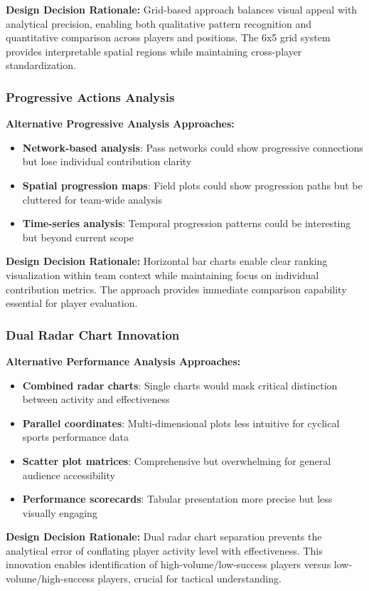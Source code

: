 \documentclass[12pt,a4paper]{article}
\begin{document}
\textbf{Design Decision Rationale:}
Grid-based approach balances visual appeal with analytical precision, enabling both qualitative pattern recognition and quantitative comparison across players and positions. The 6x5 grid system provides interpretable spatial regions while maintaining cross-player standardization.

\subsubsection{Progressive Actions Analysis}
\textbf{Alternative Progressive Analysis Approaches:}
\begin{itemize}
    \item \textbf{Network-based analysis}: Pass networks could show progressive connections but lose individual contribution clarity
    \item \textbf{Spatial progression maps}: Field plots could show progression paths but be cluttered for team-wide analysis
    \item \textbf{Time-series analysis}: Temporal progression patterns could be interesting but beyond current scope
\end{itemize}

\textbf{Design Decision Rationale:}
Horizontal bar charts enable clear ranking visualization within team context while maintaining focus on individual contribution metrics. The approach provides immediate comparison capability essential for player evaluation.

\subsubsection{Dual Radar Chart Innovation}
\textbf{Alternative Performance Analysis Approaches:}
\begin{itemize}
    \item \textbf{Combined radar charts}: Single charts would mask critical distinction between activity and effectiveness
    \item \textbf{Parallel coordinates}: Multi-dimensional plots less intuitive for cyclical sports performance data
    \item \textbf{Scatter plot matrices}: Comprehensive but overwhelming for general audience accessibility
    \item \textbf{Performance scorecards}: Tabular presentation more precise but less visually engaging
\end{itemize}

\textbf{Design Decision Rationale:}
Dual radar chart separation prevents the analytical error of conflating player activity level with effectiveness. This innovation enables identification of high-volume/low-success players versus low-volume/high-success players, crucial for tactical understanding.
\end{document}
